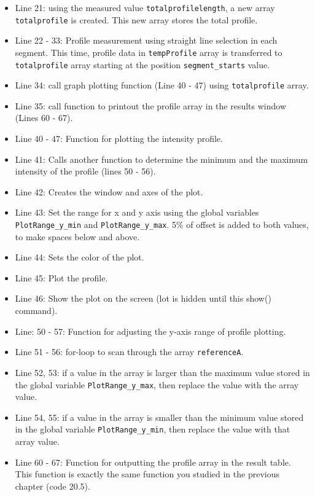 \documentclass[11pt,a4paper,oneside]{report}
\newcommand{\ilcom}[1]{\texttt{\small#1}}
\begin{document}
\begin{itemize}
\item Line 21: using the measured value \ilcom{totalprofilelength}, a new array \ilcom{totalprofile} is created. This new array stores the total profile. 

\item Line 22 - 33: Profile measurement using straight line selection in each segment. This time, profile data in \ilcom{tempProfile} array is transferred to \ilcom{totalprofile} array starting at the position \ilcom{segment\_starts} value. 

\item Line 34: call graph plotting function (Line 40 - 47) using \ilcom{totalprofile} array.

\item Line 35: call function to printout the profile array in the results window (Lines 60 - 67). 

\item Line 40 - 47: Function for plotting the intensity profile.
\item Line 41: Calls another function to determine the minimum and the maximum intensity of the profile (lines 50 - 56). 
\item Line 42: Creates the window and axes of the plot. 
\item Line 43: Set the range for x and y axis using the global variables \ilcom{PlotRange\_y\_min}  and \ilcom{PlotRange\_y\_max}. 5\% of offset is added to both values, to make spaces below and above. 
\item Line 44: Sets the color of the plot. 
\item Line 45: Plot the profile. 
\item Line 46: Show the plot on the screen (lot is hidden until this show() command).

\item Line: 50 - 57: Function for adjusting the y-axis range of profile plotting. 
\item Line 51 - 56: for-loop to scan through the array \ilcom{referenceA}. 
\item Line 52, 53: if a value in the array is larger than the maximum value stored in the global variable \ilcom{PlotRange\_y\_max}, then replace the value with the array value. 
\item Line 54, 55: if a value in the array is smaller than the minimum value stored in the global variable \ilcom{PlotRange\_y\_min}, then replace the value with that array value. 

\item Line 60 - 67: Function for outputting the profile array in the result table.  
This function is exactly the same function you studied in the previous chapter (code 20.5).

\end{itemize}
\end{document}
